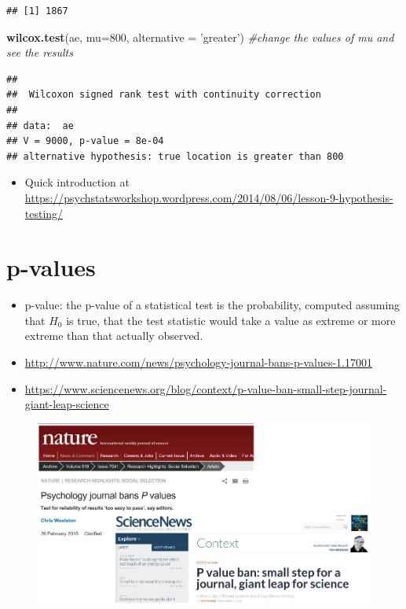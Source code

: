 \documentclass[]{book}
\newenvironment{Shaded}{\begin{snugshade}}{\end{snugshade}}
\newcommand{\KeywordTok}[1]{\textcolor[rgb]{0.13,0.29,0.53}{\textbf{{#1}}}}
\newcommand{\DataTypeTok}[1]{\textcolor[rgb]{0.13,0.29,0.53}{{#1}}}
\newcommand{\DecValTok}[1]{\textcolor[rgb]{0.00,0.00,0.81}{{#1}}}
\newcommand{\StringTok}[1]{\textcolor[rgb]{0.31,0.60,0.02}{{#1}}}
\newcommand{\CommentTok}[1]{\textcolor[rgb]{0.56,0.35,0.01}{\textit{{#1}}}}
\newcommand{\NormalTok}[1]{{#1}}
\providecommand{\tightlist}{%
  \setlength{\itemsep}{0pt}\setlength{\parskip}{0pt}}
\begin{document}
\begin{verbatim}
## [1] 1867
\end{verbatim}

\begin{Shaded}
\begin{Highlighting}[]
\KeywordTok{wilcox.test}\NormalTok{(ae, }\DataTypeTok{mu=}\DecValTok{800}\NormalTok{, }\DataTypeTok{alternative =} \StringTok{'greater'}\NormalTok{) }\CommentTok{#change the values of mu and see the results}
\end{Highlighting}
\end{Shaded}

\begin{verbatim}
## 
##  Wilcoxon signed rank test with continuity correction
## 
## data:  ae
## V = 9000, p-value = 8e-04
## alternative hypothesis: true location is greater than 800
\end{verbatim}

\begin{itemize}
\tightlist
\item
  Quick introduction at
  \url{https://psychstatsworkshop.wordpress.com/2014/08/06/lesson-9-hypothesis-testing/}
\end{itemize}

\section{p-values}\label{p-values}

\begin{itemize}
\tightlist
\item
  p-value: the p-value of a statistical test is the probability,
  computed assuming that \(H_0\) is true, that the test statistic would
  take a value as extreme or more extreme than that actually observed.
\item
  \url{http://www.nature.com/news/psychology-journal-bans-p-values-1.17001}
\item
  \url{https://www.sciencenews.org/blog/context/p-value-ban-small-step-journal-giant-leap-science}
\end{itemize}

\begin{figure}[htbp]
\centering
\includegraphics{figures/pvalueBan.png}
\caption{}
\end{figure}
\end{document}
